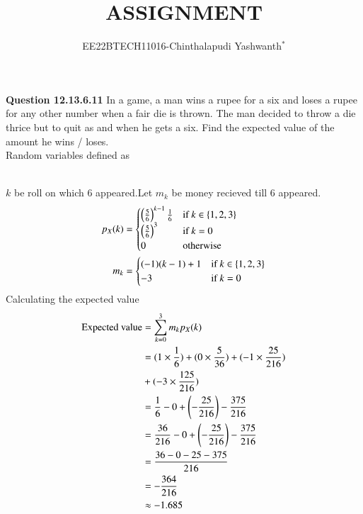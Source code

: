\documentclass[journal,12pt,twocolumn]{IEEEtran}
\theoremstyle{remark}
\begin{document}

\vspace{3cm}

\title{ASSIGNMENT}
\author{EE22BTECH11016-Chinthalapudi Yashwanth$^{*}$%
}
\maketitle
\newpage
\bigskip
\renewcommand{\thefigure}{\theenumi}
\renewcommand{\thetable}{\theenumi}

\textbf{Question 12.13.6.11}
In a game, a man wins a rupee for a six and loses a rupee for any other number
when a fair die is thrown. The man decided to throw a die thrice but to quit as
and when he gets a six. Find the expected value of the amount he wins / loses.\\
\solution
Random variables defined as
\begin{table}[!ht]
	
\end{table}\\
$k$ be roll on which 6 appeared.Let $m_k$ be money recieved till 6 appeared.
\begin{align}
p_{X}(k)&=\begin{cases}
            \left(\frac{5}{6}\right)^{k-1} \frac{1}{6} & \text{if } k \in \{1,2,3\}\\
            \left(\frac{5}{6}\right)^{3} & \text{if } k =0 \\
            0 & \text{otherwise}
        \end{cases}\\
m_k &=\begin{cases}
            (-1)(k-1)+1 & \text{if } k \in \{1,2,3\}\\
            -3 & \text{if } k =0 
        \end{cases}
\end{align}
Calculating the expected value
\begin{align}
\text{Expected value} & = \sum^{3}_{k=0} m_k p_{X}(k)\\
&=(1 \times \frac{1}{6}) + (0 \times \frac{5}{36}) + (-1 \times \frac{25}{216})\notag \\
    &+ (-3 \times \frac{125}{216}) \\
    &= \frac{1}{6} - 0 + \left(-\frac{25}{216}\right) - \frac{375}{216} \\
    &= \frac{36}{216} - 0 + \left(-\frac{25}{216}\right) - \frac{375}{216} \\
    &= \frac{36 - 0 - 25 - 375}{216} \\
    &= -\frac{364}{216} \\
    &\approx -1.685
\end{align}
\end{document}
